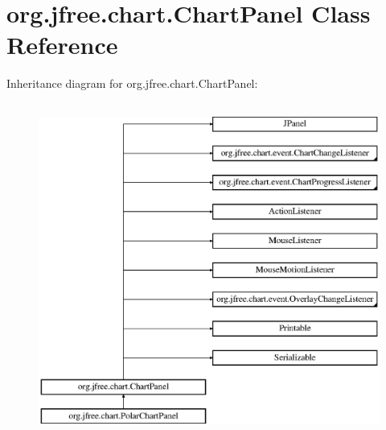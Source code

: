 \hypertarget{classorg_1_1jfree_1_1chart_1_1_chart_panel}{}\section{org.\+jfree.\+chart.\+Chart\+Panel Class Reference}
\label{classorg_1_1jfree_1_1chart_1_1_chart_panel}
Inheritance diagram for org.\+jfree.\+chart.\+Chart\+Panel\+:\begin{figure}[H]
\begin{center}
\leavevmode
\includegraphics[height=11.000000cm]{classorg_1_1jfree_1_1chart_1_1_chart_panel}
\end{center}
\end{figure}

